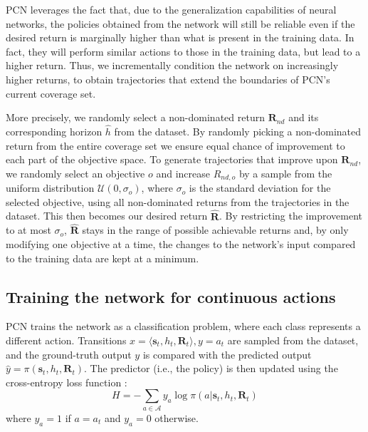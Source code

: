 \documentclass{article}
\renewcommand{\cite}[1]{\citep{#1}}
\newcommand{\mdpstate}{\mathbf{s}}
\newcommand{\momdpreturn}{\mathbf{R}}
\newcommand{\action}{a}
\begin{document}
PCN leverages the fact that, due to the generalization capabilities of neural networks, the policies obtained from the network will still be reliable even if the desired return is marginally higher than what is present in the training data. In fact, they will perform similar actions to those in the training data, but lead to a higher return. Thus, we incrementally condition the network on increasingly higher returns, to obtain trajectories that extend the boundaries of PCN's current coverage set.

More precisely, we randomly select a non-dominated return $\mathbf{R}_{nd}$ and its corresponding horizon $\hat{h}$ from the dataset. By randomly picking a non-dominated return from the entire coverage set we ensure equal chance of improvement to each part of the objective space. To generate trajectories that improve upon $\mathbf{R}_{nd}$, we randomly select an objective $o$ and increase $R_{nd,o}$ by a sample from the uniform distribution $\mathcal{U}(0, \sigma_o)$, where $\sigma_o$ is the standard deviation for the selected objective, using all non-dominated returns from the trajectories in the dataset. This then becomes our desired return $\bm{\hat{R}}$. By restricting the improvement to at most $\sigma_o$, $\mathbf{\hat{R}}$ stays in the range of possible achievable returns and, by only modifying one objective at a time, the changes to the network's input compared to the training data are kept at a minimum.

\subsection{Training the network for continuous actions}
\label{sec:pcn-continuous}

PCN trains the network as a classification problem, where each class represents a different action. Transitions $x= \langle \mdpstate_t, h_t, \momdpreturn_t \rangle, y=\action_t$ are sampled from the dataset, and the ground-truth output $y$ is compared with the predicted output $\hat{y}=\pi(\mdpstate_t, h_t, \momdpreturn_t)$. The predictor (i.e., the policy) is then updated using the cross-entropy loss function \cite{shore1980axiomatic}:
\begin{equation}
    H = -\sum_{\action \in \mathcal{A}}{y_{\action} \log \pi(\action|\mdpstate_t,h_t,\momdpreturn_t)}
\end{equation}
where $y_\action = 1$ if $\action = \action_t$ and $y_\action = 0$ otherwise.
\end{document}
